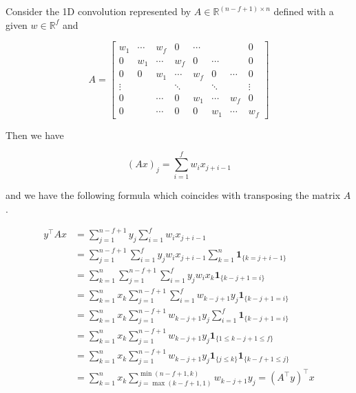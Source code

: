 \documentclass{report}
\begin{document}
\begin{example}
    Consider the 1D convolution represented by $A \in \mathbb{R}^{(n-f+1) \times n}$ defined with a given $w \in \mathbb{R}^{f}$ and

    $$
    A=\left[\begin{array}{cccccccc}
    w_{1} & \cdots & w_{f} & 0 & \cdots & & & 0 \\
    0 & w_{1} & \cdots & w_{f} & 0 & \cdots & & 0 \\
    0 & 0 & w_{1} & \cdots & w_{f} & 0 & \cdots & 0 \\
    \vdots & & & \ddots & & \ddots & & \vdots \\
    0 & & \cdots & 0 & w_{1} & \cdots & w_{f} & 0 \\
    0 & & \cdots & 0 & 0 & w_{1} & \cdots & w_{f}
    \end{array}\right]
    $$

    Then we have

    $$
    (A x)_{j}=\sum_{i=1}^{f} w_{i} x_{j+i-1}
    $$

    \par\noindent\textcolor{gray}{\hdashrule{\textwidth}{0.4pt}{1pt 2pt}}

    and we have the following formula which coincides with transposing the matrix $A$.

    $$
    \begin{aligned}
    y^{\top} A x & =\sum_{j=1}^{n-f+1} y_{j} \sum_{i=1}^{f} w_{i} x_{j+i-1} \\
    & =\sum_{j=1}^{n-f+1} \sum_{i=1}^{f} y_{j} w_{i} x_{j+i-1} \sum_{k=1}^{n} \mathbf{1}_{\{k=j+i-1\}} \\
    & =\sum_{k=1}^{n} \sum_{j=1}^{n-f+1} \sum_{i=1}^{f} y_{j} w_{i} x_{k} \mathbf{1}_{\{k-j+1=i\}} \\
    & =\sum_{k=1}^{n} x_{k} \sum_{j=1}^{n-f+1} \sum_{i=1}^{f} w_{k-j+1} y_{j} \mathbf{1}_{\{k-j+1=i\}} \\
    & =\sum_{k=1}^{n} x_{k} \sum_{j=1}^{n-f+1} w_{k-j+1} y_{j} \sum_{i=1}^{f} \mathbf{1}_{\{k-j+1=i\}} \\
    & =\sum_{k=1}^{n} x_{k} \sum_{j=1}^{n-f+1} w_{k-j+1} y_{j} \mathbf{1}_{\{1 \leq k-j+1 \leq f\}} \\
    & =\sum_{k=1}^{n} x_{k} \sum_{j=1}^{n-f+1} w_{k-j+1} y_{j} \mathbf{1}_{\{j \leq k\}} \mathbf{1}_{\{k-f+1 \leq j\}} \\
    & =\sum_{k=1}^{n} x_{k} \sum_{j=\max (k-f+1,1)}^{\min (n-f+1, k)} w_{k-j+1} y_{j}=\left(A^{\top} y\right)^{\top} x \\
    \end{aligned}
    $$
\end{example}
\end{document}
